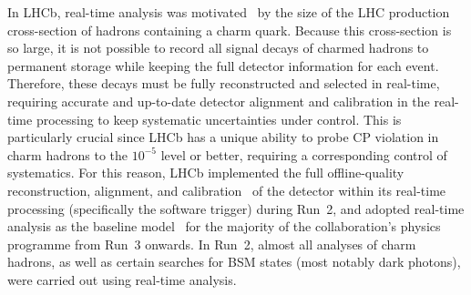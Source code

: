 

In LHCb, real-time analysis was motivated~\cite{Gligorov:2018fuk} by the size of the LHC production cross-section of hadrons containing a charm 
quark. Because this cross-section is so large, it is not possible to record all signal decays of charmed hadrons to permanent storage while keeping the full detector information for each event. Therefore, these decays must be fully reconstructed and selected in real-time, requiring accurate and up-to-date detector alignment and calibration in the real-time processing to keep systematic uncertainties under control. This is particularly crucial since LHCb has a unique ability to probe CP violation in charm hadrons to the $10^{-5}$ level or better, requiring a corresponding control of systematics. For this reason, LHCb implemented the full offline-quality reconstruction, alignment, and calibration~\cite{Dujany:2015lxd, Aaij:2016rxn, Borghi:2017hfp, LHCb:2018zdd, Aaij:2019uij} of the detector within its real-time processing (specifically the software trigger) during Run~2, and adopted real-time analysis as the baseline model~\cite{LHCbCollaboration:2319756} for the majority of the collaboration's physics programme from Run~3 onwards. In Run~2, almost all analyses of charm hadrons, as well as certain searches for BSM states (most notably dark photons), were carried out using real-time analysis.